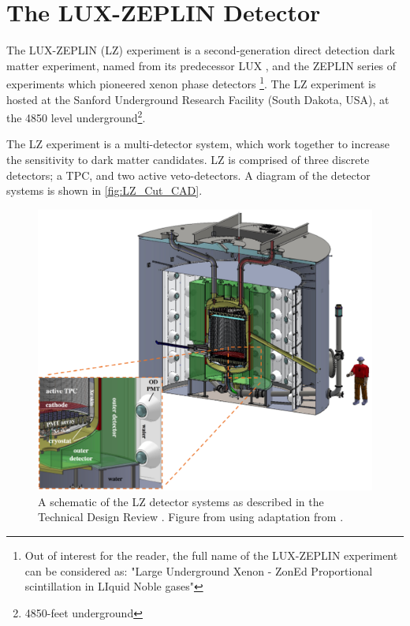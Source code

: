 \section{The LUX-ZEPLIN Detector}
\label{sec:lz_detector}
\par
The LUX-ZEPLIN (LZ) experiment is a second-generation direct detection dark matter experiment, named from its predecessor LUX \cite{lux_ref}, and the ZEPLIN series of experiments which pioneered xenon phase detectors \cite{zeplin_3_ref}\footnote{Out of interest for the reader, the full name of the LUX-ZEPLIN experiment can be considered as: "Large Underground Xenon - ZonEd Proportional scintillation in LIquid Noble gases"}.
The LZ experiment is hosted at the Sanford Underground Research Facility (South Dakota, USA), at the 4850 level underground\footnote{4850-feet underground}.

\par
The LZ experiment is a multi-detector system, which work together to increase the sensitivity to dark matter candidates.
LZ is comprised of three discrete detectors; a TPC, and two active veto-detectors.
A diagram of the detector systems is shown in \autoref{fig:LZ_Cut_CAD}.

\begin{figure}
    \centering
    \includegraphics[width=\textwidth]{Figures/LZ/LZ_CAD_with_interactions.png}
    \caption{A schematic of the LZ detector systems as described in the Technical Design Review \cite{LZ_TechnicalDesignReview_ref}.
             Figure from \cite{LZ_TechnicalDesignReview_ref} using adaptation from \cite{LZ_Ibles_LZStats_Thesis_ref}.}
    \label{fig:LZ_Cut_CAD}
\end{figure}

